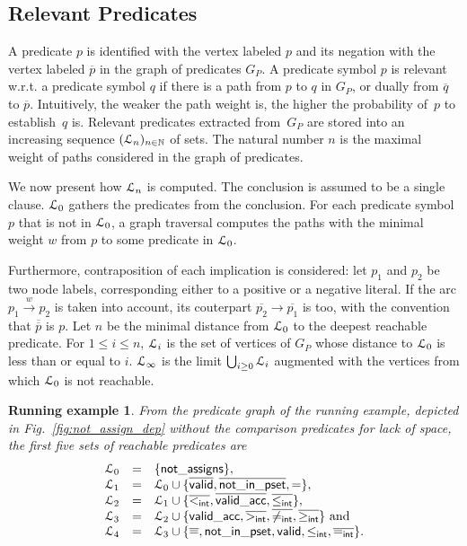 \documentclass{acm_proc_article-sp}
\theoremstyle{nonumberplain}
\newtheorem{xpl}{Running example}}
\newcommand{\valid}[0]{\ensuremath{\mathsf{valid}}}
\newcommand{\notassigns}[0]{\ensuremath{\mathsf{not\_assigns}}}
\newcommand{\validacc}[0]{\ensuremath{\mathsf{valid\_acc}}}
\newcommand{\Nats}[0]{\ensuremath{\mathbb{N}}}
\newcommand{\notinpset}[0]{\ensuremath{\mathsf{not\_in\_pset}}}
\newcommand{\eL}{\EuScript L}
\begin{document}
\subsection{Relevant Predicates}\label{sub:rel:pred}
A predicate $p$ is identified with the vertex labeled $p$ and its
negation with the vertex labeled $\overline{p}$
 in the graph of predicates $G_P$. A predicate 
symbol \(p\) is relevant w.r.t. a predicate symbol \(q\) if there is 
a path from \(p\) to \(q\) in $G_P$, or dually from \(\overline{q}\) 
to \(\overline{p}\). 
Intuitively, the weaker the path weight is, the 
higher the probability of~\(p\) to establish~\(q\) is. Relevant 
predicates extracted from~$G_P$ are stored into
an increasing sequence $(\eL_n)_{n \in \Nats}$ of sets.
The natural number $n$ is the maximal weight of paths considered in
the graph of predicates. 


We now present how $\eL_n$ is computed.
The conclusion is assumed to be a single clause.
$\eL_0$ gathers the predicates from the conclusion.
For each predicate symbol $p$ that is not in $\eL_0$, a graph traversal
computes the paths with the minimal  weight $w$ from $p$ to some
predicate in \(\eL_0\).


Furthermore, contraposition of each implication is considered: 
let  $p_1$ and $p_2$ be two node labels, corresponding either
to a positive or a negative literal.
If the arc $p_1 \overset{w}{\longrightarrow} p_2$ is taken into account, 
its couterpart $\overline{p_2} \longrightarrow \overline{p_1}$ is too,
with the convention that $\overline{\overline{p}}$ is $p$.
Let $n$ be the minimal distance from $\eL_0$ to the deepest 
reachable predicate. For $1 \le i \le n$, $\eL_i$ is the set of 
vertices of $G_P$ whose distance to $\eL_0$ is less than or equal 
to $i$. $\eL_{\infty}$ is the
limit $\bigcup_{i \geq 0} \eL_i$ 
augmented with the vertices from which $\eL_0$ is not reachable.  


\begin{xpl}
From the predicate graph of the running example, depicted in
Fig.~\ref{fig:not_assign_dep} without the comparison predicates for
lack of space, the first five sets of reachable predicates are
\[
\begin{array}{llllll}
{\eL}_0 & = &\{\notassigns\},\\
{\eL}_1 & = & {\eL}_0 \cup \{\overline{\valid},
\overline{\notinpset}, = \}, \\
{\eL}_2 & = & {\eL}_1 \cup \{
  \overline{<_{\textsf{int}}},
  \overline{\validacc},
  \overline{\leq_{\textsf{int}}}
  \}, \\ 
{\eL}_3 & = & {\eL}_2 \cup \{
  \validacc,
  \overline{>_{\textsf{int}}},
  \overline{\neq_{\textsf{int}}},
  \overline{\geq_{\textsf{int}}}
  \} \textrm{ and }\\
{\eL}_4 & = & {\eL}_3 \cup \{
  \overline{=},
  \notinpset,
  \valid,   
  \leq_{\textsf{int}},
  \overline{=_{\textsf{int}}}
\}.
\end{array}
\]
\end{xpl}
\end{document}
